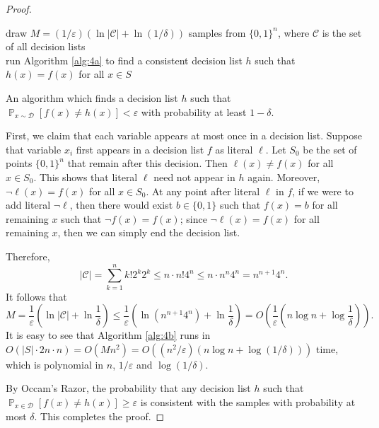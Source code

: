 \documentclass[letterpaper, reqno,11pt]{article}
\newcommand{\PP}{\mathop{{}\mathbb{P}}}
\begin{document}
\begin{enumerate}
\begin{proof}
    \begin{algorithm}
      draw $M = (1/\varepsilon) (\ln|\mathcal C| + \ln(1/\delta))$ samples from $\{ 0, 1 \}^n$, where $\mathcal C$ is the set of all decision lists \\
      run Algorithm \ref{alg:4a} to find a consistent decision list $h$ such that $h(x) = f(x)$ for all $x \in S$ \\
      \caption{An algorithm which finds a decision list $h$ such that $\PP_{x \sim \mathcal D}[f(x) \neq h(x)] < \varepsilon$ with probability at least $1 - \delta$.}
      \label{alg:4b}
    \end{algorithm}

    First, we claim that each variable appears at most once in a decision list. Suppose that variable $x_i$ first appears in a decision list $f$ as literal $\ell$. Let $S_0$ be the set of points $\{ 0, 1 \}^n$ that remain after this decision. Then $\ell(x) \neq f(x)$ for all $x \in S_0$. This shows that literal $\ell$ need not appear in $h$ again. Moreover, $\neg \ell(x) = f(x)$ for all $x \in S_0$. At any point after literal $\ell$ in $f$, if we were to add literal $\neg \ell$, then there would exist $b \in \{ 0, 1 \}$ such that $f(x) = b$ for all remaining $x$ such that $\neg f(x) = f(x)$; since $\neg \ell(x) = f(x)$ for all remaining $x$, then we can simply end the decision list.
    
    Therefore,
    $$ |\mathcal C| = \sum_{k = 1}^n k! 2^k 2^k \leq n \cdot n! 4^n \leq n \cdot n^n 4^n = n^{n + 1} 4^n. $$
    It follows that
    $$ M = \frac{1}{\varepsilon} \left(\ln |\mathcal C| + \ln \frac{1}{\delta}\right) \leq \frac{1}{\varepsilon} \left(\ln \left(n^{n + 1} 4^n\right) + \ln \frac{1}{\delta}\right) = O\left(\frac{1}{\varepsilon}\left(n \log n + \log \frac{1}{\delta}\right)\right). $$
    It is easy to see that Algorithm \ref{alg:4b} runs in $O(|S| \cdot 2n \cdot n) = O(Mn^2) = O((n^2/\varepsilon)(n \log n + \log(1/\delta)))$ time, which is polynomial in $n$, $1/\varepsilon$ and $\log(1/\delta)$.

    By Occam's Razor, the probability that any decision list $h$ such that $\PP_{x \in \mathcal D}[f(x) \neq h(x)] \geq \varepsilon$ is consistent with the samples with probability at most $\delta$. This completes the proof.
  \end{proof}
\end{enumerate}
\end{document}
